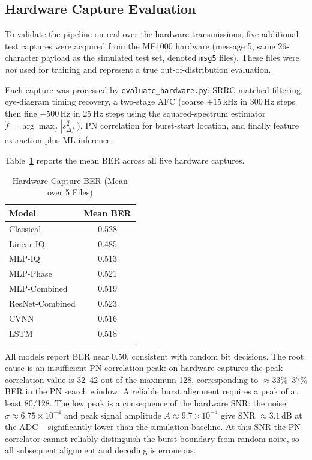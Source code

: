 \documentclass[journal]{IEEEtran}
\begin{document}
\subsection{Hardware Capture Evaluation}
\label{sec:hw_results}

To validate the pipeline on real over-the-hardware transmissions, five additional
test captures were acquired from the ME1000 hardware (message 5, same 26-character
payload as the simulated test set, denoted \texttt{msg5} files). These files were
\emph{not} used for training and represent a true out-of-distribution evaluation.

Each capture was processed by \texttt{evaluate\_hardware.py}: SRRC matched
filtering, eye-diagram timing recovery, a two-stage AFC (coarse $\pm15$\,kHz in
300\,Hz steps then fine $\pm500$\,Hz in 25\,Hz steps using the squared-spectrum
estimator $\hat{f}=\arg\max_f|\overline{s_{\Delta f}^2}|$), PN correlation for
burst-start location, and finally feature extraction plus ML inference.

Table~\ref{tab:hw_ber} reports the mean BER across all five hardware captures.

\begin{table}[!t]
  \centering
  \caption{Hardware Capture BER (Mean over 5 Files)}
  \label{tab:hw_ber}
  \begin{tabular}{lc}
    \toprule
    Model & Mean BER \\
    \midrule
    Classical      & 0.528 \\
    Linear-IQ      & 0.485 \\
    MLP-IQ         & 0.513 \\
    MLP-Phase      & 0.521 \\
    MLP-Combined   & 0.519 \\
    ResNet-Combined& 0.523 \\
    CVNN           & 0.516 \\
    LSTM           & 0.518 \\
    \bottomrule
  \end{tabular}
\end{table}

All models report BER near 0.50, consistent with random bit decisions.  The root
cause is an insufficient PN correlation peak: on hardware captures the peak
correlation value is 32--42 out of the maximum 128, corresponding to
$\approx 33\%$--$37\%$ BER in the PN search window.  A reliable burst alignment
requires a peak of at least 80/128.  The low peak is a consequence of the hardware
SNR: the noise $\sigma \approx 6.75 \times 10^{-4}$ and peak signal amplitude
$A \approx 9.7 \times 10^{-4}$ give SNR $\approx 3.1\,\text{dB}$ at the ADC --
significantly lower than the simulation baseline.  At this SNR the PN correlator
cannot reliably distinguish the burst boundary from random noise, so all subsequent
alignment and decoding is erroneous.
\end{document}
